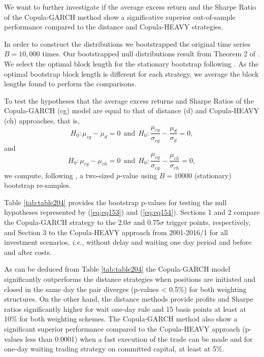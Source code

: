\documentclass[a4paper,12pt]{report}
\begin{document}
\begin{refsection}
We want to further investigate if the average excess return and the Sharpe Ratio of the Copula-GARCH method show a significative superior out-of-sample performance compared to the distance and Copula-HEAVY strategies. 

In order to construct the distributions we bootstrapped the original time series $B=10,000$ times. Our bootstrapped null distributions result from Theorem 2 of \citet*{pr94}. We select the optimal block length for the stationary bootstrap following \citet*{pw04}. As the optimal bootstrap block length is different for each strategy, we average the block lengths found to perform the comparisons. 

To test the hypotheses that the average excess returns and Sharpe Ratios of the Copula-GARCH (cg) model are equal to that of distance (d) and Copula-HEAVY (ch) approaches, that is,
\begin{equation}
H_{0}:\mu_{cg}-\mu_{d}=0  \ \ \textrm{and}
\ \  H_{0}:\frac{\mu_{cg}}{\sigma_{cg}}-\frac{\mu_{d}}{\sigma_{d}}=0,
\label{eq:eq153}
\end{equation} 
and
\begin{equation}
H_{0}:\mu_{cg}-\mu_{ch}=0  \ \ \textrm{and}
\ \  H_{0}:\frac{\mu_{cg}}{\sigma_{cg}}-\frac{\mu_{ch}}{\sigma_{ch}}=0,
\label{eq:eq154}
\end{equation} we compute, following \citet*{davison1997}, a two-sized $p$-value using $B=10000$ (stationary) bootstrap re-samples. 

Table \ref{tab:table204} provides the bootstrap p-values for testing the null hypotheses represented by (\ref{eq:eq153}) and (\ref{eq:eq154}). Sections 1 and 2 compare the Copula-GARCH strategy to the 2.0$\sigma$ and 0.75$\sigma$ trigger points, respectively, and Section 3 to the Copula-HEAVY approach from 2001-2016/1 for all investment scenarios, \emph{i.e.}, without delay and waiting one day period and before and after costs.

As can be deduced from Table \ref{tab:table204} the Copula-GARCH model significantly outperforms the distance strategies when positions are initiated and closed in the same day the pair diverges (p-values < 0.5\%) for both weighting structures. On the other hand, the distance methods provide profits and Sharpe ratios significantly higher for wait one-day rule and 15 basis points at least at 10\% for both weighting schemes. The Copula-GARCH method also show a significant superior performance compared to the Copula-HEAVY approach (p-values less than 0.0001) when a fast execution of the trade can be made and for one-day waiting trading strategy on committed capital, at least at 5\%.


\end{refsection}
\end{document}
